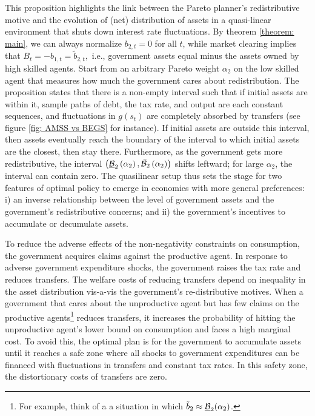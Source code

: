 \documentclass[thmsb,11pt]{article}
\begin{document}
{\smallskip
This proposition highlights the link between the Pareto planner's  redistributive motive  and the evolution of (net) distribution of assets in a quasi-linear environment that  shuts down  interest rate fluctuations.  By theorem \ref{theorem: main}, we  can always normalize $%
b_{2,t}=0$ for all $t$, while  market clearing implies that $B_{t}=-b_{1,t}=\tilde{b}_{2,t},$ i.e., government assets equal minus the assets owned by high skilled agents. Start from an arbitrary Pareto weight  $\alpha_2$ on the low skilled  agent that measures how much the government cares about redistribution. The proposition states that there is a non-empty interval such that if  initial assets   are within it,  sample paths of debt, the tax rate, and  output are each constant sequences, and fluctuations in $g(s_t)$ are completely absorbed by transfers (see figure \ref{fig: AMSS vs BEGS} for instance). If  initial assets are  outside this interval, then assets eventually reach the boundary of the interval
to which initial assets are the closest,  then stay there.  Furthermore, as the government gets more redistributive, the interval
 $\left( \underline{\mathcal{%
B}}_{2}\left( \alpha _{2}\right) ,\mathcal{\bar{\mathcal{B}}}_{2}\left(
\alpha _{2}\right) \right) $ shifts leftward;  for large $\alpha_2$, the interval  can contain zero.  The quasilinear setup thus sets the stage for two features of optimal policy to emerge in economies with more general preferences: i) an inverse relationship between the level of government assets and the government's redistributive concerns; and ii) the government's incentives  to accumulate or decumulate assets.




 To reduce the adverse effects of  the non-negativity constraints on consumption, the government acquires claims against the productive agent. In response to adverse government expenditure shocks, the government raises the tax rate and
reduces transfers. The welfare costs of reducing transfers depend on   inequality in the
asset distribution  vis-a-vis the government's
re-distributive motives. When a government that cares  about the unproductive
agent but has  few claims on the productive agents\footnote{For example, think of a
a situation in which $\tilde{b}_{2}\approx \underline{%
\mathcal{B}}_{2}(\alpha _{2})$.}  reduces transfers, it increases the probability of hitting the unproductive agent's
lower bound on consumption and faces a high marginal cost. %
To avoid this, the optimal plan
is for the government to accumulate assets until it reaches a safe zone  where all
shocks to government expenditures  can be financed with fluctuations in transfers and constant  tax rates.
 In this safety zone,  the distortionary costs of transfers are zero.

}
\end{document}

